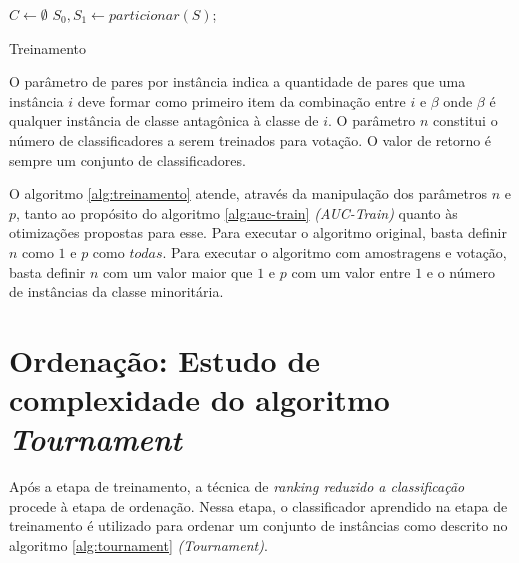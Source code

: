 \begin{algorithm}[h!]

    $C \gets \emptyset$\;
    $S_0, S_1 \gets particionar(S)$;



    \caption{Treinamento}
    \label{alg:treinamento}
\end{algorithm}

O parâmetro de pares por instância indica a quantidade de pares que uma instância $i$ deve formar como primeiro item da combinação entre $i$ e $\beta$ onde $\beta$ é qualquer instância de classe antagônica à classe de $i$. O parâmetro $n$ constitui o número de classificadores a serem treinados para votação. O valor de retorno é sempre um conjunto de classificadores.

O algoritmo \ref{alg:treinamento} atende, através da manipulação dos parâmetros $n$ e $p$, tanto ao propósito do algoritmo \ref{alg:auc-train} \emph{(AUC-Train)} quanto às otimizações propostas para esse. Para executar o algoritmo original, basta definir $n$ como $1$ e $p$ como $todas$. Para executar o algoritmo com amostragens e votação, basta definir $n$ com um valor maior que $1$ e $p$ com um valor entre $1$ e o número de instâncias da classe minoritária.


\section{Ordenação: Estudo de complexidade do algoritmo \emph{Tournament}}

Após a etapa de treinamento, a técnica de \emph{ranking reduzido a classificação} procede à etapa de ordenação. Nessa etapa, o classificador aprendido na etapa de treinamento é utilizado para ordenar um conjunto de instâncias como descrito no algoritmo \ref{alg:tournament} \emph{(Tournament)}.

